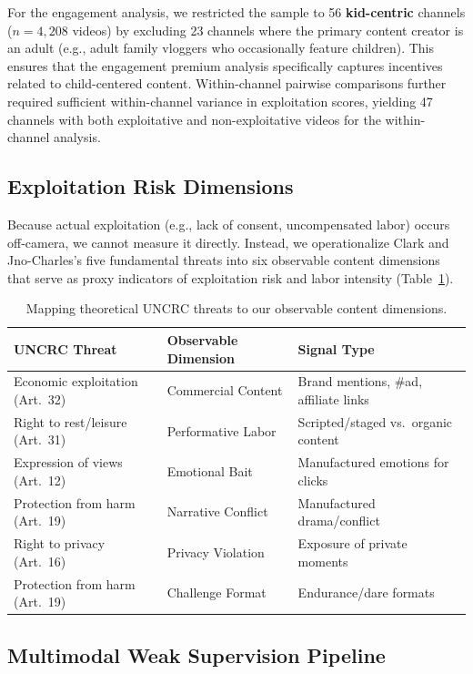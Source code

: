 \documentclass[]{ieeeaccess}
\begin{document}
For the engagement analysis, we restricted the sample to 56 \textbf{kid-centric} channels ($n=4{,}208$ videos) by excluding 23 channels where the primary content creator is an adult (e.g., adult family vloggers who occasionally feature children). This ensures that the engagement premium analysis specifically captures incentives related to child-centered content. Within-channel pairwise comparisons further required sufficient within-channel variance in exploitation scores, yielding 47 channels with both exploitative and non-exploitative videos for the within-channel analysis.

\subsection{Exploitation Risk Dimensions}

Because actual exploitation (e.g., lack of consent, uncompensated labor) occurs off-camera, we cannot measure it directly. Instead, we operationalize Clark and Jno-Charles's \cite{clark2025child} five fundamental threats into six observable content dimensions that serve as proxy indicators of exploitation risk and labor intensity (Table~\ref{tab:mapping}).

\begin{table}[t]
\centering
\begin{tabular}{p{2.5cm}p{2.5cm}p{2.5cm}}
\toprule
\textbf{UNCRC Threat} & \textbf{Observable Dimension} & \textbf{Signal Type} \\
\midrule
Economic exploitation (Art.~32) & Commercial Content & Brand mentions, \#ad, affiliate links \\
Right to rest/leisure (Art.~31) & Performative Labor & Scripted/staged vs.\ organic content \\
Expression of views (Art.~12) & Emotional Bait & Manufactured emotions for clicks \\
Protection from harm (Art.~19) & Narrative Conflict & Manufactured drama/conflict \\
Right to privacy (Art.~16) & Privacy Violation & Exposure of private moments \\
Protection from harm (Art.~19) & Challenge Format & Endurance/dare formats \\
\bottomrule
\end{tabular}
\caption{Mapping theoretical UNCRC threats to our observable content dimensions.}
\label{tab:mapping}
\end{table}

\subsection{Multimodal Weak Supervision Pipeline}
\end{document}
